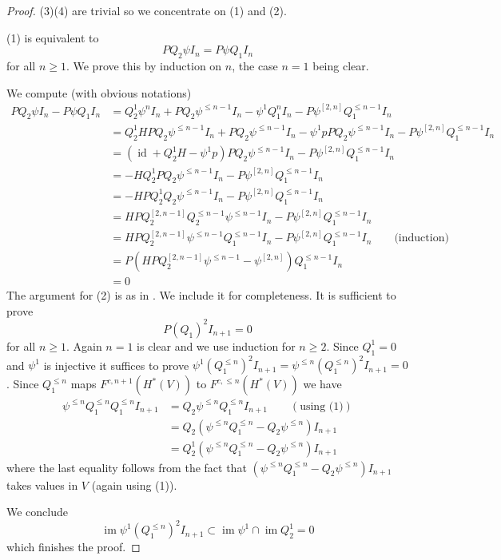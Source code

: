 \documentclass{amsart}
\numberwithin{equation}{section}
\theoremstyle{definition}
\theoremstyle{remark}
\begin{document}
\begin{proof}
(3)(4) are trivial so we concentrate on (1) and (2). 

(1) is equivalent to 
\[
PQ_2\psi I_n=P \psi Q_1 I_n
\]
for all $n\ge 1$. We prove this by induction on $n$, the case $n=1$
being clear.

We compute (with obvious notations)
\begin{align*}
PQ_2\psi I_n- P \psi Q_1 I_n&=Q^1_2\psi^nI_n+PQ_2\psi^{\le n-1}I_n
-\psi^1 Q^n_1 I_n-P\psi^{[2,n]}Q^{\le n-1}_1I_n\\
&=Q^1_2 HPQ_2\psi^{\le n-1}I_n+PQ_2\psi^{\le n-1}I_n
-\psi^1 pPQ_2\psi^{\le n-1}I_n-P\psi^{[2,n]}Q^{\le n-1}_1I_n\\
&=({{\operatorname {id}}}+Q^1_2 H-\psi^1 p)PQ_2\psi^{\le n-1}I_n
-P\psi^{[2,n]}Q^{\le n-1}_1I_n\\
&=-HQ^1_2PQ_2\psi^{\le n-1}I_n
-P\psi^{[2,n]}Q^{\le n-1}_1I_n\\
&=-HPQ^1_2Q_2\psi^{\le n-1}I_n
-P\psi^{[2,n]}Q^{\le n-1}_1I_n\\
&=HPQ^{[2,n-1]}_2 Q_2^{\le n-1}\psi^{\le n-1}I_n-P\psi^{[2,n]}Q^{\le n-1}_1I_n\\
&=HPQ^{[2,n-1]}_2\psi^{\le n-1} Q_1^{\le n-1}I_n-P\psi^{[2,n]}Q^{\le n-1}_1I_n\qquad \text{(induction)}\\
&=P(HPQ^{[2,n-1]}_2\psi^{\le n-1}-\psi^{[2,n]}) Q_1^{\le n-1}I_n\\
&=0
\end{align*}
The argument for (2) is as in \cite{GH}. We include it for
completeness.  It is sufficient to prove
\[
P (Q_1)^2 I_{n+1}=0
\]
for all $n\ge 1$. Again $n=1$ is clear and we use induction for $n\ge 2$. 
Since $Q_1^1=0$ and $\psi^1$ is injective it
suffices to prove $\psi^1(Q_1^{\le n})^2I_{n+1}=\psi^{\le n}(Q_1^{\le
  n})^2I_{n+1}=0$. Since $Q_1^{\le n}$ maps $F^{c,n+1}(H^\ast(V))$ to
$F^{c,\le n}(H^\ast(V))$ we have
\begin{align*}
\psi^{\le
  n}Q_1^{\le n}Q_1^{\le n}I_{n+1}&=Q_2\psi^{\le
  n}Q_1^{\le n}I_{n+1}\qquad (\text{using (1)})\\
&=Q_2(\psi^{\le
  n}Q_1^{\le n}-Q_2\psi^{\le n})I_{n+1}\\
&=Q_2^1(\psi^{\le
  n}Q_1^{\le n}-Q_2\psi^{\le n})I_{n+1}
\end{align*}
where the last equality follows from the fact that $(\psi^{\le
  n}Q_1^{\le n}-Q_2\psi^{\le n})I_{n+1}$ takes values in $V$ (again using (1)).

We conclude
\[
{\operatorname {im}} \psi^1(Q_1^{\le n})^2 I_{n+1}\subset{\operatorname {im}} \psi^1\cap {\operatorname {im}} Q_2^1=0
\]
which finishes the proof.
\end{proof}
\end{document}
